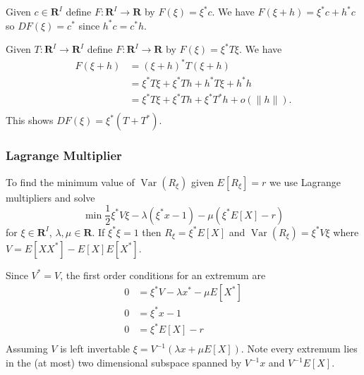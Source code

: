 Given \(c\in\mathbf{R}^I\) define \(F\colon\mathbf{R}^I\to\mathbf{R}\)
by \(F(\xi) = \xi^*c\). We have \({F(\xi + h) = \xi^*c + h^*c}\) so
\(DF(\xi) = c^*\) since \(h^*c = c^*h\).

Given \(T\colon\mathbf{R}^I\to\mathbf{R}^I\) define
\(F\colon\mathbf{R}^I\to\mathbf{R}\) by \(F(\xi) = \xi^*T\xi\). We have
\[
\begin{aligned}
    F(\xi + h) &= (\xi + h)^*T(\xi + h) \\
        &= \xi^*T\xi + \xi^*Th + h^*T\xi + h^*h \\
        &= \xi^*T\xi + \xi^*Th + \xi^*T^*h + o(\|h\|). \\
\end{aligned}
\] This shows \(DF(\xi) = \xi^*(T + T^*)\).

\subsubsection{Lagrange Multiplier}\label{lagrange-multiplier}

To find the minimum value of \(\operatorname{Var}(R_\xi)\) given
\(E[R_\xi] = r\) we use Lagrange multipliers and solve \[
        \min \frac{1}{2}\xi^* V\xi - \lambda(\xi^* x - 1) - \mu(\xi^* E[X] - r)
\] for \(\xi\in\mathbf{R}^I\), \(\lambda, \mu\in\mathbf{R}\). If
\({\xi^* \xi = 1}\) then \({R_\xi = \xi^* E[X]}\) and
\({\operatorname{Var}(R_\xi) = \xi^* V\xi}\) where
\({V = E[XX^*] - E[X]E[X^*]}\).

Since \(V^* = V\), the first order conditions for an extremum are \[
\begin{aligned}
        0 &= \xi^*V - \lambda x^* - \mu E[X^*] \\
        0 &= \xi^* x - 1 \\
        0 &= \xi^* E[X] - r \\
\end{aligned}
\] Assuming \(V\) is left invertable
\(\xi = V^{-1}(\lambda x + \mu E[X])\). Note every extremum lies in the
(at most) two dimensional subspace spanned by \(V^{-1}x\) and
\(V^{-1}E[X]\).

